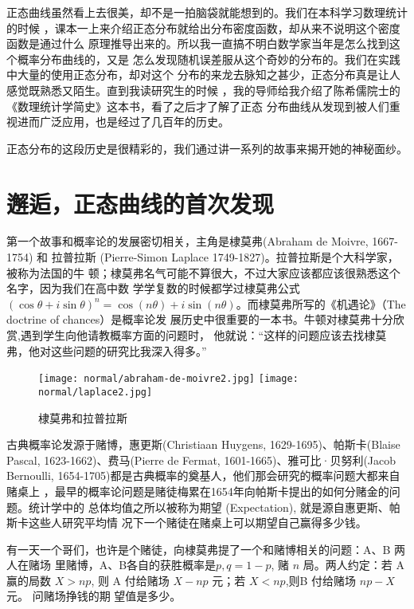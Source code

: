 正态曲线虽然看上去很美，却不是一拍脑袋就能想到的。我们在本科学习数理统计的时候
，课本一上来介绍正态分布就给出分布密度函数，却从来不说明这个密度函数是通过什么
原理推导出来的。所以我一直搞不明白数学家当年是怎么找到这个概率分布曲线的，又是
怎么发现随机误差服从这个奇妙的分布的。我们在实践中大量的使用正态分布，却对这个
分布的来龙去脉知之甚少，正态分布真是让人感觉既熟悉又陌生。直到我读研究生的时候
，我的导师给我介绍了陈希儒院士的《数理统计学简史》这本书，看了之后才了解了正态
分布曲线从发现到被人们重视进而广泛应用，也是经过了几百年的历史。

正态分布的这段历史是很精彩的，我们通过讲一系列的故事来揭开她的神秘面纱。

\section{邂逅，正态曲线的首次发现}

第一个故事和概率论的发展密切相关，主角是棣莫弗(Abraham de Moivre, 1667-1754) 和
拉普拉斯 (Pierre-Simon Laplace 1749-1827)。拉普拉斯是个大科学家，被称为法国的牛
顿；棣莫弗名气可能不算很大，不过大家应该都应该很熟悉这个名字，因为我们在高中数
学学复数的时候都学过棣莫弗公式 $(\cos\theta + i \sin\theta)^n = \cos(n\theta) +
i \sin(n\theta)$。而棣莫弗所写的《机遇论》（The doctrine of chances）是概率论发
展历史中很重要的一本书。牛顿对棣莫弗十分欣赏,遇到学生向他请教概率方面的问题时，
他就说：“这样的问题应该去找棣莫弗，他对这些问题的研究比我深入得多。”

\begin{figure}[htbp]
\centering
\texttt{[image: normal/abraham-de-moivre2.jpg]}
\quad \quad
\texttt{[image: normal/laplace2.jpg]}
\caption{棣莫弗和拉普拉斯}
\end{figure}

古典概率论发源于赌博，惠更斯(Christiaan Huygens, 1629-1695)、帕斯卡(Blaise
Pascal, 1623-1662)、费马(Pierre de Fermat, 1601-1665)、雅可比·贝努利(Jacob
Bernoulli, 1654-1705)都是古典概率的奠基人，他们那会研究的概率问题大都来自赌桌上
，最早的概率论问题是赌徒梅累在1654年向帕斯卡提出的如何分赌金的问题。统计学中的
总体均值之所以被称为期望 (Expectation), 就是源自惠更斯、帕斯卡这些人研究平均情
况下一个赌徒在赌桌上可以期望自己赢得多少钱。

有一天一个哥们，也许是个赌徒，向棣莫弗提了一个和赌博相关的问题：A、B 两人在赌场
里赌博，A、B各自的获胜概率是$p, q=1-p$, 赌 $n$ 局。两人约定：若 A 赢的局数 $X >
np$, 则 A 付给赌场 $X-np$ 元；若 $X<np$,则B 付给赌场 $np-X$ 元。 问赌场挣钱的期
望值是多少。

